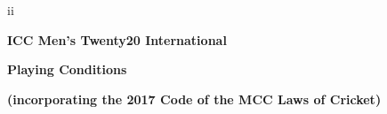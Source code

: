 \documentclass[12pt]{article}
\begin{document}
\vspace{\baselineskip}

\vspace{\baselineskip}

\vspace{\baselineskip}

\vspace{\baselineskip}

\vspace{\baselineskip}

\vspace{\baselineskip}

\vspace{\baselineskip}

\vspace{\baselineskip}

\vspace{\baselineskip}

\vspace{\baselineskip}

\vspace{\baselineskip}

\vspace{\baselineskip}

\vspace{\baselineskip}

\vspace{\baselineskip}

\vspace{\baselineskip}
\begin{Center}
{\fontsize{9pt}{10.8pt}\selectfont ii\par}
\end{Center}\par


\vspace{\baselineskip}
\begin{Center}
{\fontsize{16pt}{19.2pt}\selectfont \textbf{ICC Men’s Twenty20 International}\par}
\end{Center}\par


\vspace{\baselineskip}
\begin{Center}
{\fontsize{16pt}{19.2pt}\selectfont \textbf{Playing Conditions}\par}
\end{Center}\par


\vspace{\baselineskip}
\begin{adjustwidth}{0.97in}{0.0in}
\textbf{(incorporating the 2017 Code of the MCC Laws of Cricket)}\par

\end{adjustwidth}
\end{document}
